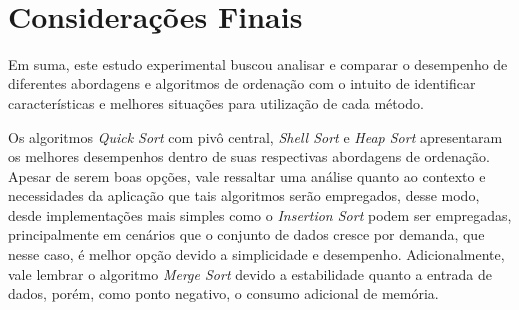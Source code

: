 \documentclass[conference]{IEEEtran}
\begin{document}
~\\
\section{Considerações Finais}

Em suma, este estudo experimental buscou analisar e comparar o desempenho de diferentes abordagens e algoritmos de ordenação com o intuito de identificar características e melhores situações para utilização de cada método.

Os algoritmos \textit{Quick Sort} com pivô central, \textit{Shell Sort} e \textit{Heap Sort} apresentaram os melhores desempenhos dentro de suas respectivas abordagens de ordenação. Apesar de serem boas opções, vale ressaltar uma análise quanto ao contexto e necessidades da aplicação que tais algoritmos serão empregados, desse modo, desde implementações mais simples como o \textit{Insertion Sort} podem ser empregadas, principalmente em cenários que o conjunto de dados cresce por demanda, que nesse caso, é melhor opção devido a simplicidade e desempenho. Adicionalmente, vale lembrar o algoritmo \textit{Merge Sort} devido a estabilidade quanto a entrada de dados, porém, como ponto negativo, o consumo adicional de memória.










\end{document}
